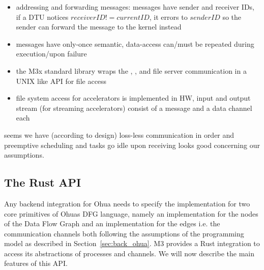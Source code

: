 \begin{itemize}
\begin{itemize}
        \item addressing and forwarding messages: messages have sender and receiver IDs, if a DTU notices $receiverID != currentID$, it errors to $senderID$ so the sender can forward the message to the kernel instead
        \item messages have only-once semantic, data-access can/must be repeated during execution/upon failure
        \item the M3x standard library wraps the , ,  and  file server communication in a UNIX like API for file access 
        \item file system access for accelerators is implemented in HW, input and output stream (for streaming accelerators) consist of a message and a data channel each
    \end{itemize}
\end{itemize}
\means seems we have (according to design) loss-less communication in order and preemptive scheduling and tasks go idle upon receiving \means looks good concerning our assumptions. 

\subsection{The Rust API}
Any backend integration for Ohua needs to specify the implementation for two core primitives of Ohuas DFG language, namely an implementation for the nodes of the Data Flow Graph and an implementation for the edges i.e. the communication channels both following the assumptions of the programming model as described in Section~\ref{sec:back_ohua}. M3 provides a Rust integration to access its abstractions of processes and channels. We will now describe the main features of this API. \\

